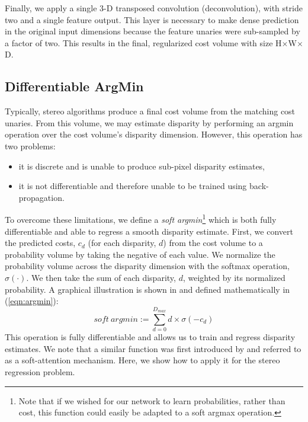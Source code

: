 Finally, we apply a single 3-D transposed convolution (deconvolution), with stride two and a single feature output. This layer is necessary to make dense prediction in the original input dimensions because the feature unaries were sub-sampled by a factor of two. This results in the final, regularized cost volume with size H$\times$W$\times$D.

\subsection{Differentiable ArgMin}
\label{sec:argmin}

Typically, stereo algorithms produce a final cost volume from the matching cost unaries. From this volume, we may estimate disparity by performing an argmin operation over the cost volume’s disparity dimension. However, this operation has two problems:
\begin{itemize}[noitemsep]
\item it is discrete and is unable to produce sub-pixel disparity estimates,
\item it is not differentiable and therefore unable to be trained using back-propagation.
\end{itemize}
To overcome these limitations, we define a \textit{soft argmin}\footnote{Note that if we wished for our network to learn probabilities, rather than cost, this function could easily be adapted to a soft argmax operation.} which is both fully differentiable and able to regress a smooth disparity estimate. First, we convert the predicted costs, $c_d$ (for each disparity, $d$) from the cost volume to a probability volume by taking the negative of each value. We normalize the probability volume across the disparity dimension with the softmax operation, $\sigma (\cdot)$. We then take the sum of each disparity, $d$, weighted by its normalized probability. A graphical illustration is shown in  and defined mathematically in (\ref{eqn:argmin}):
\begin{equation}
soft~argmin := \sum_{d=0}^{D_{max}} d \times \sigma (-c_d)
\label{eqn:argmin}
\end{equation}
This operation is fully differentiable and allows us to train and regress disparity estimates. We note that a similar function was first introduced by \citep{bahdanau2014neural} and referred to as a soft-attention mechanism. Here, we show how to apply it for the stereo regression problem.

